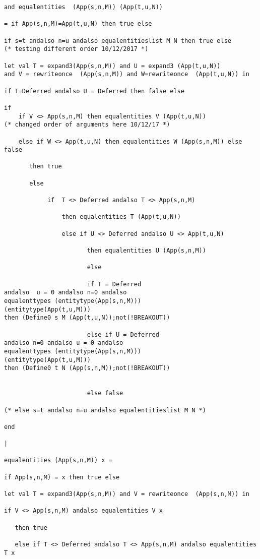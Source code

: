\documentclass{article}
\begin{document}
\begin{verbatim}
and equalentities  (App(s,n,M)) (App(t,u,N))

= if App(s,n,M)=App(t,u,N) then true else

if s=t andalso n=u andalso equalentitieslist M N then true else 
(* testing different order 10/12/2017 *)

let val T = expand3(App(s,n,M)) and U = expand3 (App(t,u,N)) 
and V = rewriteonce  (App(s,n,M)) and W=rewriteonce  (App(t,u,N)) in

if T=Deferred andalso U = Deferred then false else

if 
    if V <> App(s,n,M) then equalentities V (App(t,u,N)) 
(* changed order of arguments here 10/12/17 *)

    else if W <> App(t,u,N) then equalentities W (App(s,n,M)) else false 

       then true

       else 

            if  T <> Deferred andalso T <> App(s,n,M) 

                then equalentities T (App(t,u,N)) 

                else if U <> Deferred andalso U <> App(t,u,N) 

                       then equalentities U (App(s,n,M)) 

                       else 
					   
					   if T = Deferred 
andalso  u = 0 andalso n=0 andalso 
equalenttypes (entitytype(App(s,n,M)))
(entitytype(App(t,u,M))) 
then (Define0 s M (App(t,u,N));not(!BREAKOUT))
					   
					   else if U = Deferred 
andalso n=0 andalso u = 0 andalso  
equalenttypes (entitytype(App(s,n,M)))
(entitytype(App(t,u,M))) 
then (Define0 t N (App(s,n,M));not(!BREAKOUT))
					   
					   
					   else false

(* else s=t andalso n=u andalso equalentitieslist M N *)

end

|

equalentities (App(s,n,M)) x =

if App(s,n,M) = x then true else

let val T = expand3(App(s,n,M)) and V = rewriteonce  (App(s,n,M)) in 

if V <> App(s,n,M) andalso equalentities V x

   then true

   else if T <> Deferred andalso T <> App(s,n,M) andalso equalentities T x


\end{verbatim}
\end{document}

